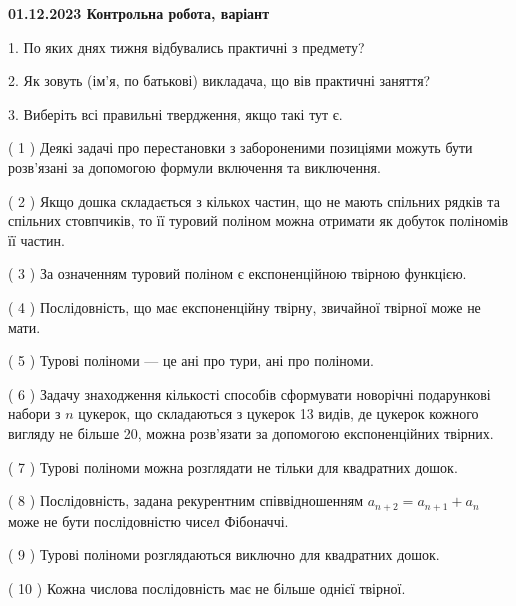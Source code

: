 \documentclass[12pt, ukrainian]{article}
\begin{document}
\vspace{4mm}
\newpage
\begin {large}

\textbf{01.12.2023 Контрольна робота, варіант  }\par


{
1. По яких днях тижня відбувались практичні з предмету?



\vspace{5mm}
2. Як зовуть (ім'я, по батькові) викладача, що вів практичні заняття?



\vspace{5mm}
3. Виберіть всі правильні твердження, якщо такі тут є.\par
\vspace{2mm}
( 1 ) Деякі задачі про перестановки з забороненими позиціями можуть бути розв’я\-за\-ні за допомогою формули включення та виключення.%

( 2 ) Якщо дошка складається з кількох частин, що не мають спільних рядків та спільних стовпчиків, то її туровий поліном можна отримати як добуток поліномів її частин.%

( 3 ) За означенням туровий поліном є експоненційною твірною функцією.%

( 4 ) Послідовність, що має експоненційну твірну, звичайної твірної може не мати.%

( 5 ) Турові поліноми --- це ані про тури, ані про поліноми.%

( 6 ) Задачу знаходження кількості способів сформувати новорічні подарункові набори з $n$ цукерок, що складаються з цукерок 13 видів, де цукерок кожного вигляду не більше 20, можна розв’язати за допомогою експоненційних твірних.%

( 7 ) Турові поліноми можна розглядати не тільки для квадратних дошок.%

( 8 ) Послідовність, задана рекурентним співвідношенням $a_{n+2}=a_{n+1}+a_{n}$ може не бути послідовністю чисел Фібоначчі.%

( 9 ) Турові поліноми розглядаються виключно для квадратних дошок.%

( 10 ) Кожна числова послідовність має не більше однієї твірної.%
}
\end {large}
\end{document}
